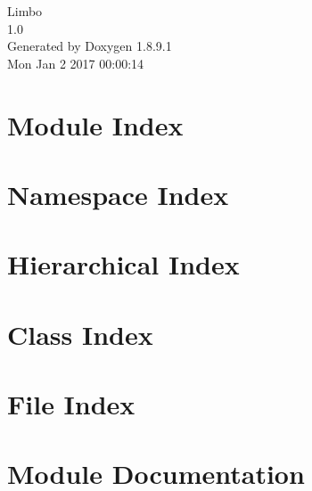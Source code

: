 \documentclass[twoside]{book}
\newcommand{\+}{\discretionary{\mbox{\scriptsize$\hookleftarrow$}}{}{}}
\newcommand{\clearemptydoublepage}{%
  \newpage{\pagestyle{empty}\cleardoublepage}%
}
\begin{document}
\hypersetup{pageanchor=false,
             bookmarks=true,
             bookmarksnumbered=true,
             pdfencoding=unicode
            }
\begin{titlepage}
\vspace*{7cm}
\begin{center}%
{\Large Limbo \\[1ex]\large 1.\+0 }\\
\vspace*{1cm}
{\large Generated by Doxygen 1.8.9.1}\\
\vspace*{0.5cm}
{\small Mon Jan 2 2017 00:00:14}\\
\end{center}
\end{titlepage}
\clearemptydoublepage
\tableofcontents
\clearemptydoublepage
{}
\hypersetup{pageanchor=true}

\chapter{Module Index}

\chapter{Namespace Index}

\chapter{Hierarchical Index}

\chapter{Class Index}

\chapter{File Index}

\chapter{Module Documentation}



















\end{document}
